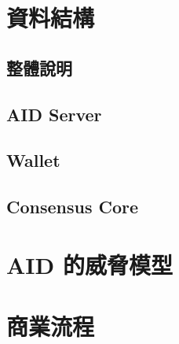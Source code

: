 \section{資料結構}
\subsection{整體說明}
\subsection{AID Server}
\subsection{Wallet}
\subsection{Consensus Core}

\section{AID 的威脅模型}

\section{商業流程}